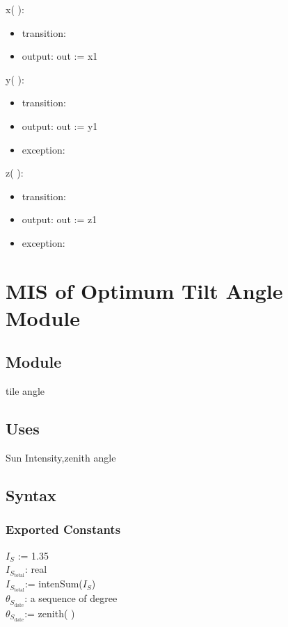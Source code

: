 \documentclass[12pt, titlepage]{article}
\begin{document}
\noindent x( ):
\begin{itemize}
\item transition:
\item output: out := x1
\end{itemize}

\noindent  y( ):
\begin{itemize}
\item transition:
\item output: out := y1
\item exception: 
\end{itemize}

\noindent  z( ):
\begin{itemize}
\item transition:
\item output: out := z1
\item exception: 
\end{itemize}



\section{MIS of Optimum Tilt Angle Module} \label{ModuleOT} 

\subsection{Module}
tile angle

\subsection{Uses}
Sun Intensity,zenith angle

\subsection{Syntax}


\subsubsection{Exported Constants}

$I_{S}$ := 1.35\\
$I_{S_{\text{total}}}$: real\\
$I_{S_{\text{total}}}$:= intenSum($I_{S}$)\\
$\theta_{S_{\text{date}}}$: a sequence of degree\\
$\theta_{S_{\text{date}}}$:= zenith( )\\
\end{document}
